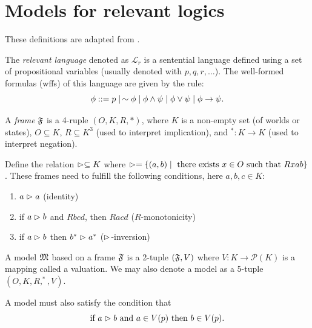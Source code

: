 \section{Models for relevant logics}

These definitions are adapted from \cite{fuhrmann1990models}.

\begin{definition}
    The \textit{relevant language} denoted as $\mathcal{L}_{r}$ is a sentential language defined using a set of propositional variables (usually denoted with $p,q,r,\ldots$).
    The well-formed formulas (wffs) of this language are given by the rule:
    $$\phi ::= p \mid \,\sim\phi \mid \phi\wedge\psi \mid \phi\vee\psi \mid \phi\to\psi.$$
\end{definition}

\begin{definition}[Frame]
    A \textit{frame} $\F$\index[symbs]{$\F$} is a 4-ruple $(O,K,R,*)$, where $K$ is a non-empty set (of worlds or states), $O\subseteq K$, $R\subseteq K^3$ (used to interpret implication), and $^*:K\to K$ (used to interpret negation).
    \par Define the relation $\vartriangleright \subseteq K$ where $\vartriangleright = \{(a,b) \mid\text{ there exists } x\in O \text{ such that } Rxab\}$.
    These frames need to fulfill the following conditions, here $a,b,c\in K$:
    \begin{enumerate}
        \item $a\vartriangleright a$ \hfill (identity)
        \item if $a\vartriangleright b$ and $Rbcd$, then $Racd$ \hfill ($R$-monotonicity)
        \item if $a\vartriangleright b$ then $b^* \vartriangleright a^*$ \hfill ($\vartriangleright$-inversion)
    \end{enumerate}
\end{definition}

\begin{definition}[Model]
    A model $\M$\index[symbs]{$\M$} based on a frame $\F$ is a 2-tuple $(\mathfrak{F},V)$ where $V:K\to \mathcal{P}(K)$ is a mapping called a valuation.
    We may also denote a model as a 5-tuple $(O,K,R,^*,V)$.
    \par A model must also satisfy the condition that $$\text{if } a\vartriangleright b \text{ and } a\in V(p) \text{ then } b\in V(p).$$
\end{definition}

